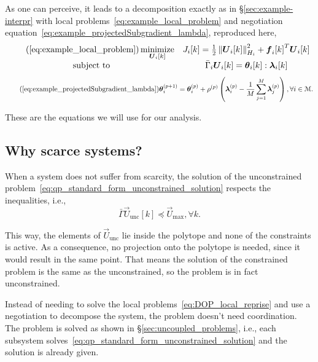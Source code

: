 \documentclass[../main.tex]{subfiles}
\begin{document}
As one can perceive, it leads to a decomposition exactly as in \S\ref{sec:example-interpr}
with local problems~\eqref{eq:example_local_problem} and negotiation equation~\eqref{eq:example_projectedSubgradient_lambda}, reproduced here,
\begin{equation}
  \begin{matrix}
  \label{eq:example_local_problem_reprise}
  \tag{\ref*{eq:example_local_problem}}
    \minimize\limits_{\vec{U}_{i}[k]}&\obji=\frac{1}{2}\norm{\vec{U}_{i}[k]}^{2}_{H_{i}} + {\vec{f}_{i}[k]}^{T}\vec{U}_{i}[k]\\
    \mathrm{subject~ to} & \bar{\Gamma}_{i}\vec{U}_{i}[k] = \thetaik:\lambdaik
  \end{matrix}
\end{equation}
\begin{equation}
  \label{eq:example_projectedSubgradient_lambda_reprise}
  \tag{\ref*{eq:example_projectedSubgradient_lambda}}
 \thetai\pplusone=\thetai\p+\rho\p\left(\lambdai\p-\frac{1}{M}\sum_{j=1}^{M}\vec{\lambda}_j\p\right),\forall i\in\set{M}.
\end{equation}

These are the equations we will use for our analysis.

\subsection{Why scarce systems?}\label{sec:why-scarce-systems}

When a system does not suffer from scarcity, the solution of the unconstrained problem~\eqref{eq:qp_standard_form_unconstrained_solution} respects the inequalities, i.e.,
\begin{equation}
\bar{\Gamma}\vec{U}_{\text{unc}}[k]\preceq {\vec{U}}_{\text{max}},\forall k.
\end{equation}

This way, the elements of $\vec{U}_{\text{unc}}$ lie inside the polytope and none of the constraints is active.
As a consequence, no projection onto the polytope is needed, since it would result in the same point.
That means the solution of the constrained problem is the same as the unconstrained, so the problem is in fact unconstrained.

Instead of needing to solve the local problems~\eqref{eq:DOP_local_reprise} and use a negotiation to decompose the system, the problem doesn't need coordination.
The problem is solved as shown in \S\ref{sec:uncoupled_problems}, i.e., each subsystem solves~\eqref{eq:qp_standard_form_unconstrained_solution} and the solution is already given.
\end{document}
